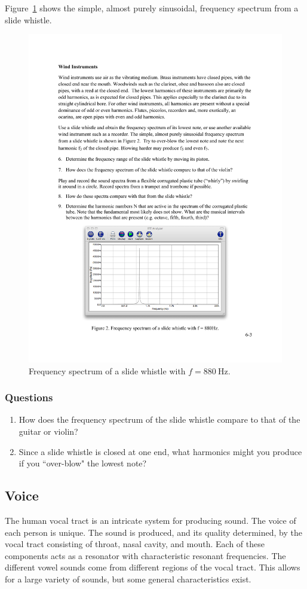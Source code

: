 \documentclass[11pt]{NSF}
\def\ben{\begin{enumerate}}
\def\een{\end{enumerate}}
\begin{document}
Figure~\ref{f:2} shows the simple, almost purely sinusoidal, frequency
spectrum from a slide whistle.
%
\begin{figure}[hbtp]
\begin{center}
\includegraphics[width=.6\textwidth]{fig6_2}
\caption{Frequency spectrum of a slide whistle with 
$f =880~\textrm{Hz}$.}
\label{f:2}
\end{center}
\end{figure}

\subsubsection*{Questions}
\ben
\item
How does the frequency spectrum of the slide whistle compare to that 
of the guitar or violin?

\item Since a slide whistle is closed at one end, what harmonics might 
you produce if you ``over-blow" the lowest note?

\een

\subsection{Voice}

The human vocal tract is an intricate system for producing sound. The
voice of each person is unique. The sound is produced, and its quality
determined, by the vocal tract consisting of throat, nasal cavity, and
mouth. Each of these components acts as a resonator with
characteristic resonant frequencies. The different vowel sounds come
from different regions of the vocal tract. This allows for a large
variety of sounds, but some general characteristics exist.
\end{document}
